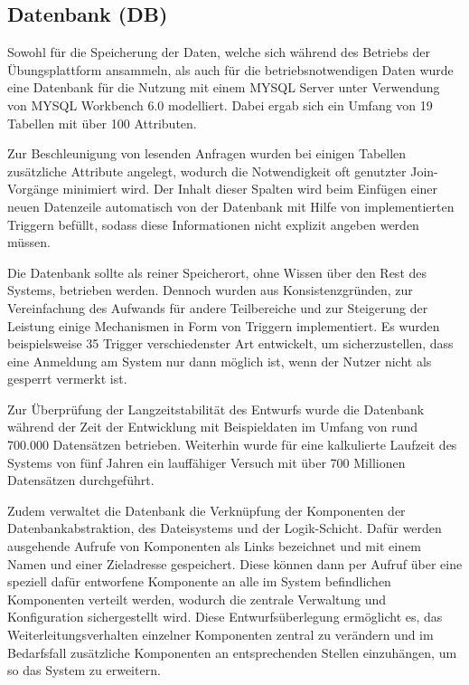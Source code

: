 \subsection{Datenbank (DB)}
\parbox{\textwidth}{Sowohl für die Speicherung der Daten, welche sich während des Betriebs der Übungsplattform ansammeln, als auch für die betriebsnotwendigen Daten wurde eine Datenbank für die Nutzung mit einem MYSQL Server unter Verwendung von MYSQL Workbench 6.0 modelliert. Dabei ergab sich ein Umfang von 19 Tabellen mit über 100 Attributen. }

\parbox{\textwidth}{Zur Beschleunigung von lesenden Anfragen wurden bei einigen Tabellen zusätzliche Attribute angelegt, wodurch die Notwendigkeit oft genutzter Join-Vorgänge minimiert wird. Der Inhalt dieser Spalten wird beim Einfügen einer neuen Datenzeile automatisch von der Datenbank mit Hilfe von implementierten Triggern befüllt, sodass diese Informationen nicht explizit angeben werden müssen.} 

\parbox{\textwidth}{Die Datenbank sollte als reiner Speicherort, ohne Wissen über den Rest des Systems, betrieben werden. Dennoch wurden aus Konsistenzgründen, zur Vereinfachung des Aufwands für andere Teilbereiche und zur Steigerung der Leistung einige Mechanismen in Form von Triggern implementiert.
Es wurden beispielsweise 35 Trigger verschiedenster Art entwickelt, um sicherzustellen, dass eine Anmeldung am System nur dann möglich ist, wenn der Nutzer nicht als gesperrt vermerkt ist.}
 
\parbox{\textwidth}{Zur Überprüfung der Langzeitstabilität des Entwurfs wurde die Datenbank während der Zeit der Entwicklung mit Beispieldaten im Umfang von rund 700.000 Datensätzen betrieben. Weiterhin wurde für eine kalkulierte Laufzeit des Systems von fünf Jahren ein lauffähiger Versuch mit über 700 Millionen Datensätzen durchgeführt.}

\parbox{\textwidth}{Zudem verwaltet die Datenbank die Verknüpfung der Komponenten der Daten\-bank\-abstraktion, des Dateisystems und der Logik-Schicht. Dafür werden ausgehende Aufrufe von Komponenten als Links bezeichnet und mit einem Namen und einer Ziel\-adresse gespeichert. Diese können dann per Aufruf über eine speziell dafür entworfene Komponente an alle im System befindlichen Komponenten verteilt werden, wodurch die zentrale Verwaltung und Konfiguration sichergestellt wird. Diese Entwurfsüberlegung ermöglicht es, das Weiterleitungsverhalten einzelner Komponenten zentral zu verändern und im Bedarfsfall zusätzliche Komponenten an entsprechenden Stellen einzuhängen, um so das System zu erweitern.}


